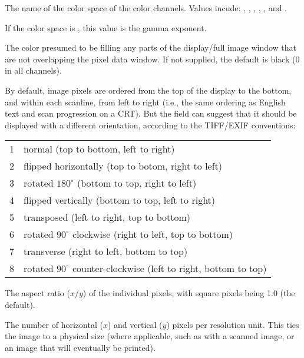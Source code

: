 The name of the color space of the color channels.  Values incude:
, , , ,
, and .
\apiend

If the color space is , this value is the gamma
exponent.
\apiend

The color presumed to be filling any parts of the display/full image
window that are not overlapping the pixel data window.  If not supplied,
the default is black (0 in all channels).
\apiend

\label{metadata:orientation}

By default, image pixels are ordered from the top of the display to the
bottom, and within each scanline, from left to right (i.e., the same
ordering as English text and scan progression on a CRT).  But the
 field can suggest that it should be displayed with
a different orientation, according to the TIFF/EXIF conventions:

\begin{tabular}{p{0.3in} p{4in}}
1 & normal (top to bottom, left to right)  \\
2 & flipped horizontally (top to botom, right to left)  \\
3 & rotated $180^\circ$ (bottom to top, right to left) \\
4 & flipped vertically (bottom to top, left to right)  \\
5 & transposed (left to right, top to bottom) \\
6 & rotated $90^\circ$ clockwise (right to left, top to bottom) \\
7 & transverse (right to left, bottom to top) \\
8 & rotated $90^\circ$ counter-clockwise (left to right, bottom to top) \\
\end{tabular}
\apiend

The aspect ratio ($x/y$) of the individual pixels, with square pixels
being 1.0 (the default).
\apiend

The number of horizontal ($x$) and vertical ($y$) pixels per 
resolution unit.  This ties the image to a physical size (where 
applicable, such as with a scanned image, or an image that will
eventually be printed).

